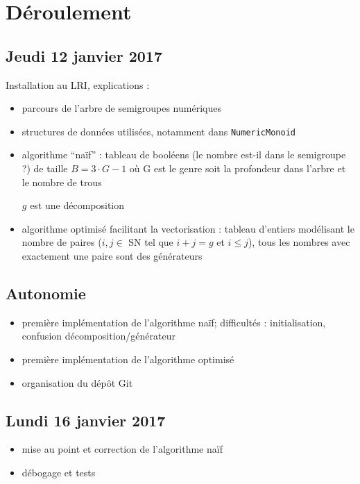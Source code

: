 \documentclass[12pt,a4paper]{report}
\let\leq\leqslant
\begin{document}
\section{Déroulement}
\label{anx:deroulement}

\subsection*{Jeudi 12 janvier 2017}
Installation au LRI, explications :
\begin{itemize}
	\item	parcours de l'arbre de semigroupes numériques

	\item	structures de données utilisées, notamment dans \texttt{NumericMonoid}

	\item	algorithme ``naïf'' : tableau de booléens (le nombre est-il dans le semigroupe ?) de taille $B = 3 \cdot G - 1$ où G est le genre soit la profondeur dans l'arbre et le nombre de trous
			\begin{algorithmic}
								\STATE $g$ est une décomposition
							\ENDIF
						\ENDFOR
					\ENDIF
				\ENDFOR
			\end{algorithmic}

	\item	algorithme optimisé facilitant la vectorisation : tableau d'entiers modélisant le nom\-bre de paires ($i, j \in$ SN tel que $i + j = g$ et $i \leq j$), tous les nombres avec exactement une paire sont des générateurs
\end{itemize}

\subsection*{Autonomie}
\begin{itemize}
	\item	première implémentation de l'algorithme naïf; difficultés : initialisation, confusion décomposition/générateur
	\item	première implémentation de l'algorithme optimisé
	\item	organisation du dépôt Git
\end{itemize}

\subsection*{Lundi 16 janvier 2017}
\begin{itemize}
	\item	mise au point et correction de l'algorithme naïf
	\item	débogage et tests
\end{itemize}
\end{document}
